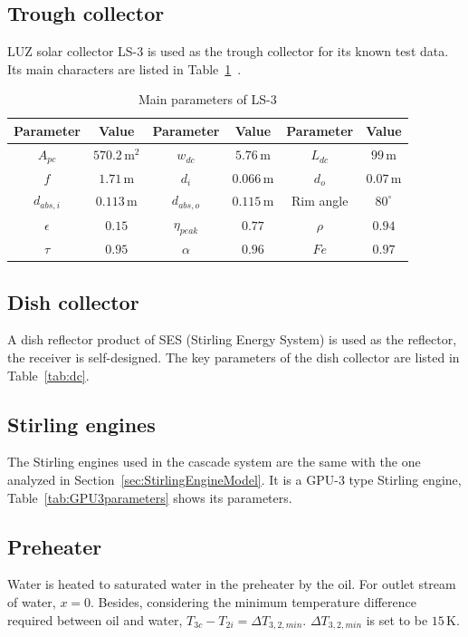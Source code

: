 \subsection{Trough collector}
LUZ solar collector LS-3 is used as the trough collector for its known test data. Its main characters are listed in Table~\ref{tab:TroughParameters}~\cite{Fernandez2010}.

\begin{table}[htbp]
	\caption{Main parameters of LS-3}
	\begin{center}
	\begin{tabular}{cccccc}
		\toprule
		Parameter		&	Value	&	Parameter		&	Value	&	Parameter		&	Value\\
		\midrule
		$A_{pc}$		&	$570.2\,\mathrm{m^2}$	&	$w_{dc}$	&	$5.76\,\mathrm{m}$	&	$L_{dc}$	&	$99\,\mathrm{m}$\\
		$f$	&	$1.71\,\mathrm{m}$	&	$d_i$		&	$0.066\,\mathrm{m}$	&	$d_o$	&	$0.07\,\mathrm{m}$\\
		$d_{abs,i}$	&	$0.113\,\mathrm{m}$	&	$d_{abs,o}$	&	$0.115\,\mathrm{m}$	&	Rim angle	&	$80^\circ$\\
		$\epsilon$		&	$0.15$	&	$\eta_{peak}$	&	$0.77$	&	$\rho$	&	$0.94$\\
		$\tau$	&	$0.95$	&	
$\alpha$	&	$0.96$	&	$Fe$	&	$0.97$\\
		\bottomrule
	\end{tabular}
	\end{center}
	\label{tab:TroughParameters}
\end{table}

\subsection{Dish collector}
A dish reflector product of SES (Stirling Energy System) is used as the reflector, the receiver is self-designed. The key parameters of the dish collector are listed in Table~\ref{tab:dc}. 

\subsection{Stirling engines}
The Stirling engines used in the cascade system are the same with the one analyzed in Section~\ref{sec:StirlingEngineModel}. It is a GPU-3 type Stirling engine, Table~\ref{tab:GPU3parameters} shows its parameters.

\subsection{Preheater}
Water is heated to saturated water in the preheater by the oil. For outlet stream of water, $x = 0$.
Besides, considering the minimum temperature difference required between oil and water, $T_{3c} - T_{2i} = \Delta T_{3,2,min}$. $\Delta T_{3,2,min}$ is set to be $15\,\mathrm{K}$.


